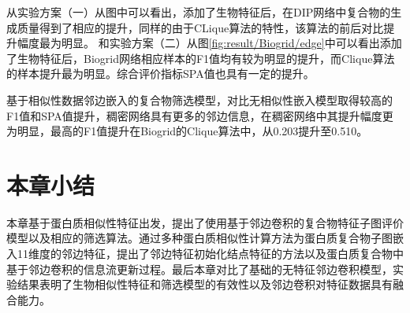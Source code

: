 从实验方案（一）从图中可以看出，添加了生物特征后，在DIP网络中复合物的生成质量得到了相应的提升，同样的由于CLique算法的特性，该算法的前后对比提升幅度最为明显。
和实验方案（二）从图\ref{fig:result/Biogrid/edge}中可以看出添加了生物特征后，Biogrid网络相应样本的F1值均有较为明显的提升，而Clique算法的样本提升最为明显。综合评价指标SPA值也具有一定的提升。

基于相似性数据邻边嵌入的复合物筛选模型，对比无相似性嵌入模型取得较高的F1值和SPA值提升，稠密网络具有更多的邻边信息，在稠密网络中其提升幅度更为明显，最高的F1值提升在Biogrid的Clique算法中，从0.203提升至0.510。


\section{本章小结}
\label{section:EdgeConv:summary}

本章基于蛋白质相似性特征出发，提出了使用基于邻边卷积的复合物特征子图评价模型以及相应的筛选算法。通过多种蛋白质相似性计算方法为蛋白质复合物子图嵌入11维度的邻边特征，提出了邻边特征初始化结点特征的方法以及蛋白质复合物中基于邻边卷积的信息流更新过程。最后本章对比了基础的无特征邻边卷积模型，实验结果表明了生物相似性特征和筛选模型的有效性以及邻边卷积对特征数据具有融合能力。
